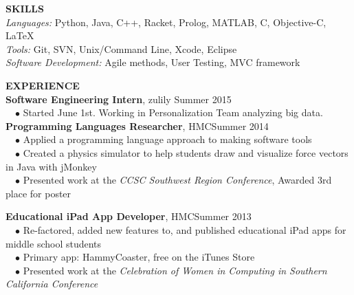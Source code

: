 \documentclass[11pt]{article}
\newcommand{\sectionNL}{\\[-2pt]}
\newcommand{\customtab}{$\hspace{10pt} \bullet \hspace{2pt}$}
\newcommand{\HMC}{HMC}
\newcommand{\rightAlign}{\hfill}
\begin{document}
\begin{flushleft}
{\textbf{SKILLS}} \sectionNL
\textit{Languages:} Python, Java, C++, Racket, Prolog, MATLAB, C, Objective-C, \LaTeX \\
\textit{Tools:} Git, SVN, Unix/Command Line, Xcode, Eclipse \\ %
\textit{Software Development:} Agile methods, User Testing, MVC framework


\end{flushleft}

\begin{flushleft}
{\textbf{EXPERIENCE}} \sectionNL
\textbf{Software Engineering Intern}, zulily \rightAlign Summer 2015 \\
\customtab Started June 1st. Working in Personalization Team analyzing big data.  \\
\textbf{Programming Languages Researcher}, \HMC \rightAlign Summer 2014 \\
\customtab Applied a programming language approach to making software tools \\
\customtab Created a physics simulator to help students draw and visualize force vectors in Java with jMonkey\\
\customtab Presented work at the \textit{CCSC Southwest Region Conference}, Awarded 3rd place for poster 

\textbf{Educational iPad App Developer}, \HMC \rightAlign Summer 2013 \\
\customtab Re-factored, added new features to, and published educational iPad apps for middle school students \\
\customtab Primary app: HammyCoaster, free on the iTunes Store \\
\customtab Presented work at the \textit{Celebration of Women in Computing in Southern California Conference }
\end{flushleft}
\end{document}
